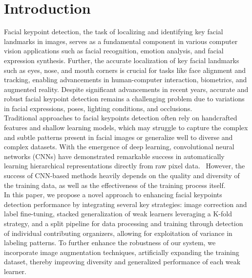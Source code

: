 \section{Introduction}
\label{sec:intro}

Facial keypoint detection, the task of localizing and identifying key facial landmarks in images, serves as a fundamental component in various computer vision applications such as facial recognition, emotion analysis, and facial expression synthesis. Further, the accurate localization of key facial landmarks such as eyes, nose, and mouth corners is crucial for tasks like face alignment and tracking, enabling advancements in human-computer interaction, biometrics, and augmented reality.  Despite significant advancements in recent years, accurate and robust facial keypoint detection remains a challenging problem due to variations in facial expressions, poses, lighting conditions, and occlusions.~\cite{WANG201850} \\

Traditional approaches to facial keypoints detection often rely on handcrafted features and shallow learning models, which may struggle to capture the complex and subtle patterns present in facial images or generalize well to diverse and complex datasets. With the emergence of deep learning, convolutional neural networks (CNNs) have demonstrated remarkable success in automatically learning hierarchical representations directly from raw pixel data.~\cite{9065279}  However, the success of CNN-based methods heavily depends on the quality and diversity of the training data, as well as the effectiveness of the training process itself.\\

In this paper, we propose a novel approach to enhancing facial keypoints detection performance by integrating several key strategies: image correction and label fine-tuning, stacked generalization of weak learners leveraging a K-fold strategy, and a split pipeline for data processing and training through detection of individual contributing organizers, allowing for exploitation of variance in labeling patterns. To further enhance the robustness of our system, we incorporate image augmentation techniques, artificially expanding the training dataset, thereby improving diversity and generalized performance of each weak learner.\\

